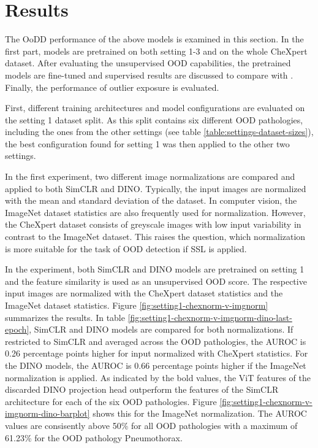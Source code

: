 \section{Results}
The OoDD performance of the above models is examined in this section.
In the first part, models are pretrained on both setting 1-3 and on the whole CheXpert dataset.
After evaluating the unsupervised OOD capabilities, the pretrained models are fine-tuned and supervised results are discussed to compare with \citep{Berger2021}.
Finally, the performance of outlier exposure is evaluated.
\par
First, different training architectures and model configurations are evaluated on the setting 1 dataset split.
As this split contains six different OOD pathologies, including the ones from the other settings (see table \ref{table:settings-dataset-sizes}), the best configuration found for setting 1 was then applied to the other two settings.
\par
In the first experiment, two different image normalizations are compared and applied to both SimCLR and DINO.
Typically, the input images are normalized with the mean and standard deviation of the dataset.
In computer vision, the ImageNet dataset statistics \citep{Deng2009} are also frequently used for normalization.
However, the CheXpert dataset consists of greyscale images with low input variability in contrast to the ImageNet dataset.
This raises the question, which normalization is more suitable for the task of OOD detection if SSL is applied.
\par
In the experiment, both SimCLR and DINO models are pretrained on setting 1 and the feature similarity is used as an unsupervised OOD score.
The respective input images are normalized with the CheXpert dataset statistics and the ImageNet dataset statistics.
Figure \ref{fig:setting1-chexnorm-v-imgnorm} summarizes the results.
In table \ref{fig:setting1-chexnorm-v-imgnorm-dino-last-epoch}, SimCLR and DINO models are compared for both normalizations.
If restricted to SimCLR and averaged across the OOD pathologies, the AUROC is 0.26 percentage points higher for input normalized with CheXpert statistics.
For the DINO models, the AUROC is 0.66 percentage points higher if the ImageNet normalization is applied.
As indicated by the bold values, the ViT features of the discarded DINO projection head outperform the features of the SimCLR architecture for each of the six OOD pathologies.
Figure \ref{fig:setting1-chexnorm-v-imgnorm-dino-barplot} shows this for the ImageNet normalization.
The AUROC values are consisently above 50\% for all OOD pathologies with a maximum of 61.23\% for the OOD pathology Pneumothorax.
